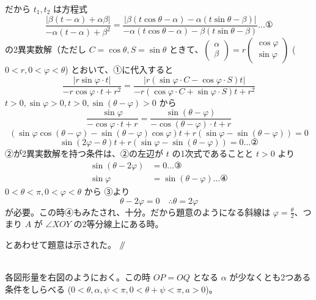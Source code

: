 \documentclass[../main.tex]{subfiles}
\begin{document}
\noindent
だから $t_1, t_2$ は方程式
\begin{equation}
  \frac{|\beta(t-\alpha) + \alpha\beta|}{-\alpha(t-\alpha) + \beta^2} = \frac{|\beta(t\cos\theta-\alpha) - \alpha(t\sin\theta-\beta)|}{-\alpha(t\cos\theta-\alpha) - \beta(t\sin\theta-\beta)} \dots \text{①}
\end{equation}
の2異実数解（ただし $C = \cos\theta, S = \sin\theta$ ときて、$
\begin{pmatrix} \alpha \\ \beta
\end{pmatrix} = r
\begin{pmatrix} \cos\varphi \\ \sin\varphi
\end{pmatrix}$ ($0 < r, 0 < \varphi < \theta$) とおいて、①に代入すると
\[
  \frac{|r\sin\varphi \cdot t|}{-r\cos\varphi \cdot t + r^2} = \frac{|r(\sin\varphi \cdot C - \cos\varphi \cdot S) t|}{-r(\cos\varphi \cdot C + \sin\varphi \cdot S) t + r^2}
\]
$t > 0, \sin\varphi > 0, t > 0, \sin(\theta-\varphi) > 0$ から
\[
  \frac{\sin\varphi}{-\cos\varphi \cdot t + r} = \frac{\sin(\theta-\varphi)}{-\cos(\theta-\varphi) \cdot t + r}
\]
\[
  \left(\sin\varphi \cos(\theta-\varphi) - \sin(\theta-\varphi)\cos\varphi\right) t + r\left(\sin\varphi - \sin(\theta-\varphi)\right) = 0
\]
\begin{equation}
  \sin(2\varphi - \theta) t + r\left(\sin\varphi - \sin(\theta-\varphi)\right) = 0 \dots \text{②}
\end{equation}
②が2異実数解を持つ条件は、②の左辺が $t$ の1次式であることと $t > 0$ より
\begin{align}
  \sin(\theta - 2\varphi) &= 0 \dots \text{③} \\
  \sin\varphi &= \sin(\theta - \varphi) \dots \text{④}
\end{align}
$0 < \theta < \pi, 0 < \varphi < \theta$ から ③より
\[
  \theta - 2\varphi = 0 \quad \therefore \theta = 2\varphi
\]
が必要。この時④もみたされ、十分。だから題意のようになる斜線は
$\varphi = \frac{\theta}{2}$、つまり $A$ が $\angle XOY$ の2等分線上にある時。

\noindent
とあわせて題意は示された。 \hfill $\mathbin{/\mkern-5mu/}$

\bigskip

\noindent
[\textbf{別解}]\\
各図形量を右図のようにおく。この時 $OP = OQ$ となる $\alpha$ が少なくとも2つある条件をしらべる
($0 < \theta, \alpha, \psi < \pi, 0 < \theta+\psi < \pi, a > 0$)。
\end{document}
